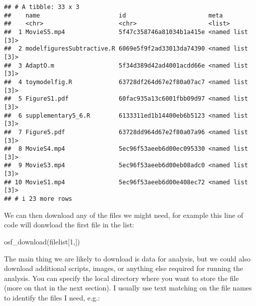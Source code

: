\documentclass[
]{article}
\newenvironment{Shaded}{\begin{snugshade}}{\end{snugshade}}
\newcommand{\CommentTok}[1]{\textcolor[rgb]{0.56,0.35,0.01}{\textit{#1}}}
\newcommand{\ControlFlowTok}[1]{\textcolor[rgb]{0.13,0.29,0.53}{\textbf{#1}}}
\newcommand{\DecValTok}[1]{\textcolor[rgb]{0.00,0.00,0.81}{#1}}
\newcommand{\FunctionTok}[1]{\textcolor[rgb]{0.00,0.00,0.00}{#1}}
\newcommand{\NormalTok}[1]{#1}
\newcommand{\OtherTok}[1]{\textcolor[rgb]{0.56,0.35,0.01}{#1}}
\newcommand{\SpecialCharTok}[1]{\textcolor[rgb]{0.00,0.00,0.00}{#1}}
\newcommand{\StringTok}[1]{\textcolor[rgb]{0.31,0.60,0.02}{#1}}
\begin{document}
\begin{verbatim}
## # A tibble: 33 x 3
##    name                      id                       meta            
##    <chr>                     <chr>                    <list>          
##  1 MovieS5.mp4               5f47c358746a81034b1a415e <named list [3]>
##  2 modelfiguresSubtractive.R 6069e5f9f2ad33013da74390 <named list [3]>
##  3 AdaptO.m                  5f34d389d42ad4001acdd66e <named list [3]>
##  4 toymodelfig.R             63728df264d67e2f80a07ac7 <named list [3]>
##  5 FigureS1.pdf              60fac935a13c6001fbb09d97 <named list [3]>
##  6 supplementary5_6.R        6133311ed1b14400eb6b5123 <named list [3]>
##  7 Figure5.pdf               63728dd964d67e2f80a07a96 <named list [3]>
##  8 MovieS4.mp4               5ec96f53aeeb6d00ec095330 <named list [3]>
##  9 MovieS3.mp4               5ec96f53aeeb6d00eb08adc0 <named list [3]>
## 10 MovieS1.mp4               5ec96f53aeeb6d00e408ec72 <named list [3]>
## # i 23 more rows
\end{verbatim}

We can then download any of the files we might need, for example this line of code will donwload the first file in the list:

\begin{Shaded}
\begin{Highlighting}[]
\FunctionTok{osf\_download}\NormalTok{(filelist[}\DecValTok{1}\NormalTok{,])}
\end{Highlighting}
\end{Shaded}

The main thing we are likely to download is data for analysis, but we could also download additional scripts, images, or anything else required for running the analysis. You can specify the local directory where you want to store the file (more on that in the next section). I usually use text matching on the file names to identify the files I need, e.g.:

\begin{Shaded}
\end{Shaded}
\end{document}
